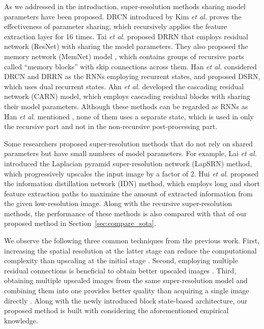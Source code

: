 \documentclass[runningheads]{llncs}
\begin{document}
As we addressed in the introduction, super-resolution methods sharing model parameters have been proposed.
DRCN introduced by Kim \textit{et al.} \cite{kim2016deeply} proves the effectiveness of parameter sharing, which recursively applies the feature extraction layer for 16 times.
Tai \textit{et al.} \cite{tai2017image} proposed DRRN that employs residual network (ResNet) \cite{he2016deep} with sharing the model parameters.
They also proposed the memory network (MemNet) model \cite{tai2017memnet}, which contains groups of recursive parts called ``memory blocks'' with skip connections across them.
Han \textit{et al.} \cite{han2018image} considered DRCN and DRRN as the RNNs employing recurrent states, and proposed DSRN, which uses dual recurrent states.
Ahn \textit{et al.} \cite{ahn2018fast} developed the cascading residual network (CARN) model, which employs cascading residual blocks with sharing their model parameters.
Although these methods can be regarded as RNNs as Han \textit{et al.} mentioned \cite{han2018image}, none of them uses a separate state, which is used in only the recursive part and not in the non-recursive post-processing part.

Some researchers proposed super-resolution methods that do not rely on shared parameters but have small numbers of model parameters.
For example, Lai \textit{et al.} \cite{lai2017deep} introduced the Laplacian pyramid super-resolution network (LapSRN) method, which progressively upscales the input image by a factor of 2.
Hui \textit{et al.} \cite{hui2018fast} proposed the information distillation network (IDN) method, which employs long and short feature extraction paths to maximize the amount of extracted information from the given low-resolution image.
Along with the recursive super-resolution methods, the performance of these methods is also compared with that of our proposed method in Section~\ref{sec:compare_sota}.

We observe the following three common techniques from the previous work.
First, increasing the spatial resolution at the latter stage can reduce the computational complexity than upscaling at the initial stage \cite{ahn2018fast,choi2017deep,hui2018fast}.
Second, employing multiple residual connections is beneficial to obtain better upscaled images \cite{kim2018deep,tai2017image}.
Third, obtaining multiple upscaled images from the same super-resolution model and combining them into one provides better quality than acquiring a single image directly \cite{kim2016deeply,lim2017enhanced,tai2017memnet}.
Along with the newly introduced block state-based architecture, our proposed method is built with considering the aforementioned empirical knowledge.
\end{document}
